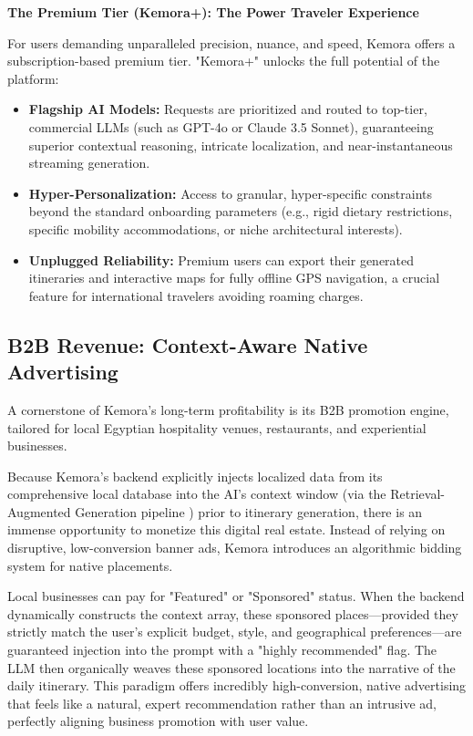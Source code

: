 \textbf{The Premium Tier (Kemora+): The Power Traveler Experience}

For users demanding unparalleled precision, nuance, and speed, Kemora offers a subscription-based premium tier. "Kemora+" unlocks the full potential of the platform:
\begin{itemize}
    \item \textbf{Flagship AI Models:} Requests are prioritized and routed to top-tier, commercial LLMs (such as GPT-4o or Claude 3.5 Sonnet), guaranteeing superior contextual reasoning, intricate localization, and near-instantaneous streaming generation.
    \item \textbf{Hyper-Personalization:} Access to granular, hyper-specific constraints beyond the standard onboarding parameters (e.g., rigid dietary restrictions, specific mobility accommodations, or niche architectural interests).
    \item \textbf{Unplugged Reliability:} Premium users can export their generated itineraries and interactive maps for fully offline GPS navigation, a crucial feature for international travelers avoiding roaming charges.
\end{itemize}

\subsection{B2B Revenue: Context-Aware Native Advertising}
A cornerstone of Kemora's long-term profitability is its B2B promotion engine, tailored for local Egyptian hospitality venues, restaurants, and experiential businesses.

Because Kemora's backend explicitly injects localized data from its comprehensive local database into the AI's context window (via the Retrieval-Augmented Generation pipeline \cite{lewis2020rag}) prior to itinerary generation, there is an immense opportunity to monetize this digital real estate. Instead of relying on disruptive, low-conversion banner ads, Kemora introduces an algorithmic bidding system for native placements.

Local businesses can pay for "Featured" or "Sponsored" status. When the backend dynamically constructs the context array, these sponsored places—provided they strictly match the user's explicit budget, style, and geographical preferences—are guaranteed injection into the prompt with a "highly recommended" flag. The LLM then organically weaves these sponsored locations into the narrative of the daily itinerary. This paradigm offers incredibly high-conversion, native advertising that feels like a natural, expert recommendation rather than an intrusive ad, perfectly aligning business promotion with user value.


